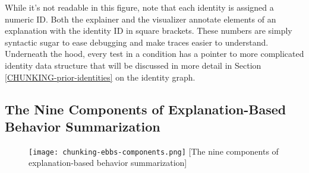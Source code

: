 While it's not readable in this figure, note that each identity is assigned a numeric ID.  Both the explainer and the visualizer annotate elements of an explanation with the identity ID in square brackets.  These numbers are simply syntactic sugar to ease debugging and make traces easier to understand.  Underneath the hood, every test in a condition has a pointer to more complicated identity data structure that will be discussed in more detail in Section \ref{CHUNKING-prior-identities} on the identity graph.


\subsection{The Nine Components of Explanation-Based Behavior Summarization}

\vspace{12pt}
\begin{figure}
	\centering
	\texttt{[image: chunking-ebbs-components.png]}%
	[The nine components of explanation-based behavior summarization]
	\label{fig:chunking-ebbs-components}
\end{figure}

